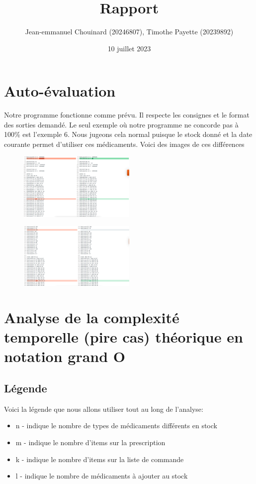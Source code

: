 \documentclass{article}
\title{Rapport}
\author{Jean-emmanuel Chouinard (20246807), Timothe Payette (20239892)}
\date{10 juillet 2023}
\begin{document}
\maketitle

\section{Auto-évaluation}

Notre programme fonctionne comme prévu. Il respecte les consignes et le format des sorties demandé. Le seul exemple où notre programme ne concorde pas à 100\% est l'exemple 6. Nous jugeons cela normal puisque le stock donné et la date courante permet d'utiliser ces médicaments. Voici des images de ces différences

\begin{figure}[htp]
\centering
\includegraphics[width=0.5\textwidth]{Diff1.png}
\end{figure}

\begin{figure}[htp]
\centering
\includegraphics[width=0.5\textwidth]{Diff2.png}
\end{figure}

\section{Analyse de la complexité temporelle (pire cas) théorique en notation grand O}


\subsection{Légende}
Voici la légende que nous allons utiliser tout au long de l'analyse:
\begin{itemize}
    \item n - indique le nombre de types de médicaments différents en stock
    \item m - indique le nombre d'items sur la prescription
    \item k - indique le nombre d'items sur la liste de commande
    \item l - indique le nombre de médicaments à ajouter au stock
\end{itemize}
\end{document}
